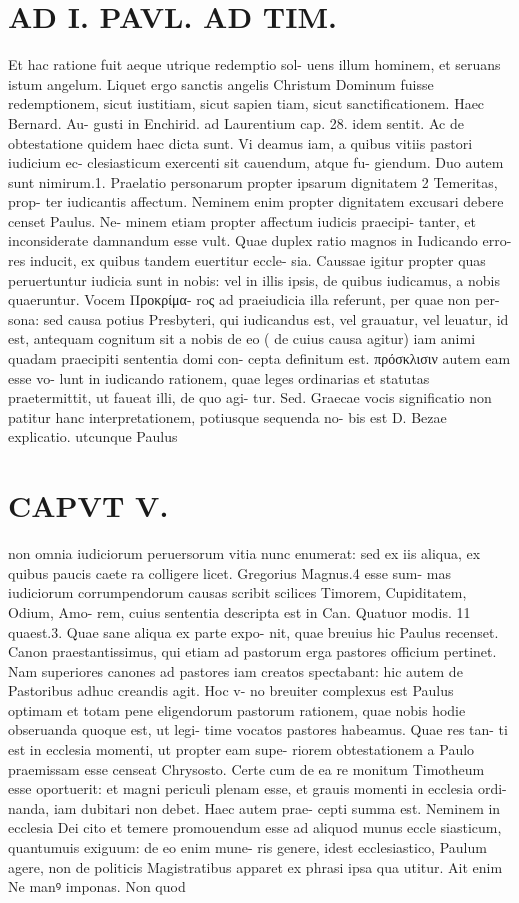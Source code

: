 \documentclass{article}
\begin{document}
\begin{pages}
\section*{AD I. PAVL. AD TIM. }
\marginpar{[ p.336 ]}Et hac ratione fuit aeque utrique redemptio sol- uens illum hominem, et seruans istum angelum. Liquet ergo sanctis angelis Christum Dominum fuisse redemptionem, sicut iustitiam, sicut sapien tiam, sicut sanctificationem. Haec Bernard. Au- gusti in Enchirid. ad Laurentium cap. 28. idem sentit. Ac de obtestatione quidem haec dicta sunt. Vi deamus iam, a quibus vitiis pastori iudicium ec- clesiasticum exercenti sit cauendum, atque fu- giendum. Duo autem sunt nimirum.1. Praelatio personarum propter ipsarum dignitatem 2 Temeritas, prop- ter iudicantis affectum. Neminem enim propter dignitatem excusari debere censet Paulus. Ne- minem etiam propter affectum iudicis praecipi- tanter, et inconsiderate damnandum esse vult. Quae duplex ratio magnos in Iudicando erro- res inducit, ex quibus tandem euertitur eccle- sia. Caussae igitur propter quas peruertuntur iudicia sunt in nobis: vel in illis ipsis, de quibus iudicamus, a nobis quaeruntur. Vocem Προκρίμα- roς ad praeiudicia illa referunt, per quae non per- sona: sed causa potius Presbyteri, qui iudicandus est, vel grauatur, vel leuatur, id est, antequam cognitum sit a nobis de eo ( de cuius causa agitur) iam animi quadam praecipiti sententia domi con- cepta definitum est. πρόσκλισιν autem eam esse vo- lunt in iudicando rationem, quae leges ordinarias et statutas praetermittit, ut faueat illi, de quo agi- tur. Sed. Graecae vocis significatio non patitur hanc interpretationem, potiusque sequenda no- bis est D. Bezae explicatio. utcunque Paulus 
\section*{CAPVT  V. }
\marginpar{[ p.337 ]}non omnia iudiciorum peruersorum vitia nunc enumerat: sed ex iis aliqua, ex quibus paucis caete ra colligere licet. Gregorius Magnus.4 esse sum- mas iudiciorum corrumpendorum causas scribit scilices Timorem, Cupiditatem, Odium, Amo- rem, cuius sententia descripta est in Can. Quatuor modis. 11 quaest.3. Quae sane aliqua ex parte expo- nit, quae breuius hic Paulus recenset.    Canon praestantissimus, qui etiam ad pastorum erga pastores officium pertinet. Nam superiores canones ad pastores iam creatos spectabant: hic autem de Pastoribus adhuc creandis agit. Hoc v- no breuiter complexus est Paulus optimam et totam pene eligendorum pastorum rationem, quae nobis hodie obseruanda quoque est, ut legi- time vocatos pastores habeamus. Quae res tan- ti est in ecclesia momenti, ut propter eam supe- riorem obtestationem a Paulo praemissam esse censeat Chrysosto. Certe cum de ea re monitum Timotheum esse oportuerit: et magni periculi plenam esse, et grauis momenti in ecclesia ordi- nanda, iam dubitari non debet. Haec autem prae- cepti summa est. Neminem in ecclesia Dei cito et temere promouendum esse ad aliquod munus eccle siasticum, quantumuis exiguum: de eo enim mune- ris genere, idest ecclesiastico, Paulum agere, non de politicis Magistratibus apparet ex phrasi ipsa qua utitur. Ait enim Ne manꝰ imponas. Non quod 

\end{pages}
\end{document}
